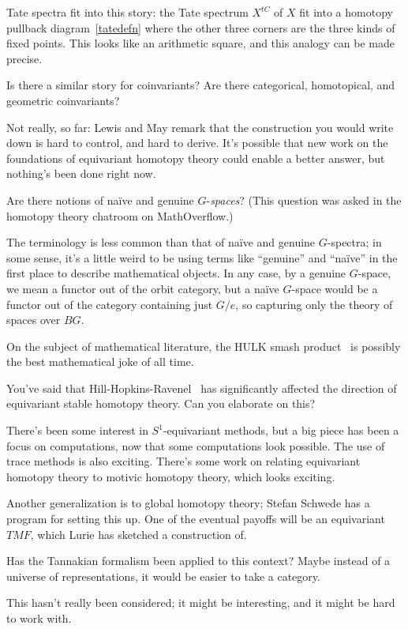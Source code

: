 Tate spectra fit into this story: the Tate spectrum $X^{tC}$ of $X$ fit into a homotopy pullback
diagram~\eqref{tatedefn} where the other three corners are the three kinds of fixed points. This looks like an
arithmetic square, and this analogy can be made precise.
\begin{ques}
Is there a similar story for coinvariants? Are there categorical, homotopical, and geometric coinvariants?
\end{ques}
Not really, so far: Lewis and May remark that the construction you would write down is hard to control, and hard to
derive. It's possible that new work on the foundations of equivariant homotopy theory could enable a better answer,
but nothing's been done right now.
\begin{ques}
Are there notions of naïve and genuine $G$-\emph{spaces}? (This question was asked in the homotopy theory chatroom
on MathOverflow.)
\end{ques}
The terminology is less common than that of naïve and genuine $G$-spectra; in some sense, it's a little weird to
be using terms like ``genuine'' and ``naïve'' in the first place to describe mathematical objects. In any case, by
a genuine $G$-space, we mean a functor out of the orbit category, but a naïve $G$-space would be a functor out of
the category containing just $G/e$, so capturing only the theory of spaces over $BG$.

On the subject of mathematical literature, the HULK smash product~\cite{HulkSmash} is possibly the best
mathematical joke of all time.
\begin{ques}
You've said that Hill-Hopkins-Ravenel~\cite{HHR} has significantly affected the direction of equivariant stable
homotopy theory. Can you elaborate on this?
\end{ques}
There's been some interest in $S^1$-equivariant methods, but a big piece has been a focus on computations, now that
some computations look possible. The use of trace methods is also exciting. There's some work on relating
equivariant homotopy theory to motivic homotopy theory, which looks exciting.

Another generalization is to global homotopy theory; Stefan Schwede has a program for setting this up. One of the
eventual payoffs will be an equivariant $\mathit{TMF}$, which Lurie has sketched a construction of.
\begin{ques}
Has the Tannakian formalism been applied to this context? Maybe instead of a universe of representations, it would
be easier to take a category.
\end{ques}
This hasn't really been considered; it might be interesting, and it might be hard to work with.

